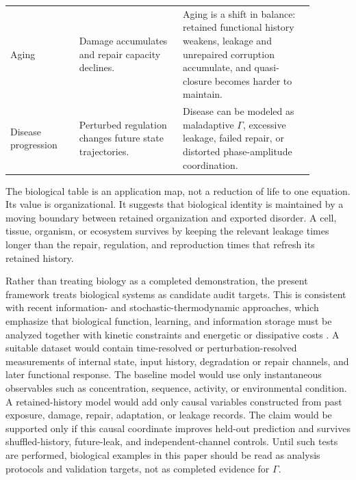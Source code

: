 \documentclass[11pt,a4paper]{article}
\newcommand{\Ghist}{\Gamma}
\begin{document}
\begin{center}
\begin{tabular}{L{0.20\linewidth}L{0.30\linewidth}L{0.38\linewidth}}
Aging & Damage accumulates and repair capacity declines. & Aging is a shift in balance: retained functional history weakens, leakage and unrepaired corruption accumulate, and quasi-closure becomes harder to maintain. \\
Disease progression & Perturbed regulation changes future state trajectories. & Disease can be modeled as maladaptive \(\Ghist\), excessive leakage, failed repair, or distorted phase-amplitude coordination. \\
\bottomrule
\end{tabular}
\label{tab:bio-correspondence}
\end{center}

The biological table is an application map, not a reduction of life to one equation.  Its value is organizational.  It suggests that biological identity is maintained by a moving boundary between retained organization and exported disorder.  A cell, tissue, organism, or ecosystem survives by keeping the relevant leakage times longer than the repair, regulation, and reproduction times that refresh its retained history.

Rather than treating biology as a completed demonstration, the present framework treats biological systems as candidate audit targets.  This is consistent with recent information- and stochastic-thermodynamic approaches, which emphasize that biological function, learning, and information storage must be analyzed together with kinetic constraints and energetic or dissipative costs \cite{Karbowski2024,CaoLiang2025}.  A suitable dataset would contain time-resolved or perturbation-resolved measurements of internal state, input history, degradation or repair channels, and later functional response.  The baseline model would use only instantaneous observables such as concentration, sequence, activity, or environmental condition.  A retained-history model would add only causal variables constructed from past exposure, damage, repair, adaptation, or leakage records.  The claim would be supported only if this causal coordinate improves held-out prediction and survives shuffled-history, future-leak, and independent-channel controls.  Until such tests are performed, biological examples in this paper should be read as analysis protocols and validation targets, not as completed evidence for \(\Ghist\).
\end{document}
